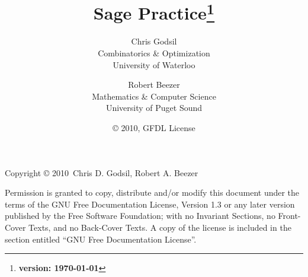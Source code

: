 \documentclass[twoside, openright, 12pt]{book}
\author{
Chris Godsil\\
Combinatorics \& Optimization\\
University of Waterloo
\and
Robert Beezer\\
Mathematics \& Computer Science\\
University of Puget Sound}
\title{\bf Sage Practice\footnote{\textbf{version: \today}}}
\date{\copyright{} 2010, GFDL License}
\numberwithin{equation}{section}
\begin{document}
\maketitle
%
\noindent Copyright \copyright{} 2010\ Chris D. Godsil, Robert A. Beezer
\par\bigskip
%
\noindent Permission is granted to copy, distribute and/or
modify this document under the terms of the GNU
Free Documentation License, Version 1.3 or any
later version published by the Free Software
Foundation; with no Invariant Sections, no Front-Cover
Texts, and no Back-Cover Texts. A copy of the license
is included in the section entitled ``GNU Free
Documentation License''.
\clearpage
%

%
\tableofcontents
\clearpage{} %






%

%
\end{document}
